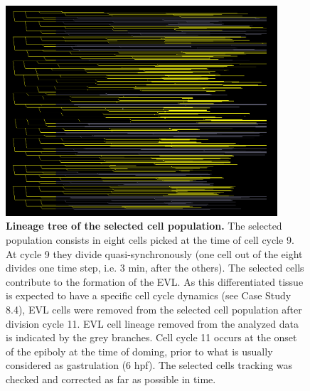 \begin{figure}
\begin{center}
\includegraphics[width=0.9\textwidth]{../../images/Cases_Studies/Case_1_Division/071222bF_t_selection_1_all_T_121224_lineage_tree_no_evl.png}
\end{center}
\caption{\textbf{Lineage tree of the selected cell population.} The selected population consists in eight cells picked at the time of cell cycle 9. At cycle 9 they divide quasi-synchronously (one cell out of the eight divides one time step, i.e. 3 min, after the others). The selected cells contribute to the formation of the EVL. As this differentiated tissue is expected to have a specific cell cycle dynamics (see Case Study 8.4), EVL cells were removed from the selected cell population after division cycle 11. EVL cell lineage removed from the analyzed data is indicated by the grey branches. Cell cycle 11 occurs at the onset of the epiboly at the time of doming, prior to what is usually considered as gastrulation (6 hpf). The selected cells tracking was checked and corrected as far as possible in time.}
\label{Case_1_Division_071222bF_t_selection_1_all_T_121224_lineage_tree_no_evl}
\end{figure}
